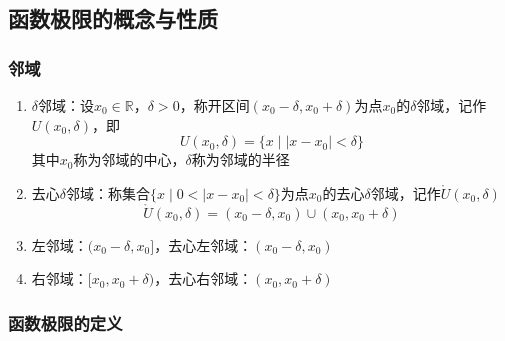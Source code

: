 \documentclass[../book.tex]{subfiles}
\begin{document}
    \subsection{函数极限的概念与性质}

    \subsubsection{邻域}

    \begin{enumerate}
        \item $\delta$邻域：设$x_0 \in \mathbb{R}$，$\delta > 0$，称开区间$(x_0 - \delta, x_0 + \delta)$为点$x_0$的$\delta$邻域，记作$U(x_0, \delta)$，即
        $$U(x_0, \delta) = \{x \mid |x - x_0| < \delta\}$$
        其中$x_0$称为邻域的中心，$\delta$称为邻域的半径

        \item 去心$\delta$邻域：称集合$\{x \mid 0 < |x - x_0| < \delta\}$为点$x_0$的去心$\delta$邻域，记作$\mathring{U}(x_0, \delta)$
        $$\mathring{U}(x_0, \delta) = (x_0 - \delta, x_0) \cup (x_0, x_0 + \delta)$$

        \item 左邻域：$(x_0 - \delta, x_0]$，去心左邻域：$(x_0 - \delta, x_0)$

        \item 右邻域：$[x_0, x_0 + \delta)$，去心右邻域：$(x_0, x_0 + \delta)$
    \end{enumerate}

    \subsubsection{函数极限的定义}
\end{document}
